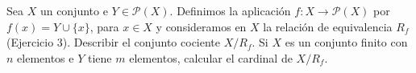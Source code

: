\begin{ejercicio}
    Sea $X$ un conjunto e $Y\in \mathcal{P}(X)$. Definimos la aplicación $f:X\to \mathcal{P}(X)$ por $f(x)=Y\cup \{x\}$, para $x\in X$ y consideramos en $X$ la relación de equivalencia $R_f$ (Ejercicio 3). Describir el conjunto cociente $X/R_f$. Si $X$ es un conjunto finito con $n$ elementos e $Y$ tiene $m$ elementos, calcular el cardinal de $X/R_f$.
\end{ejercicio}

\resetearcontador
\newpage
